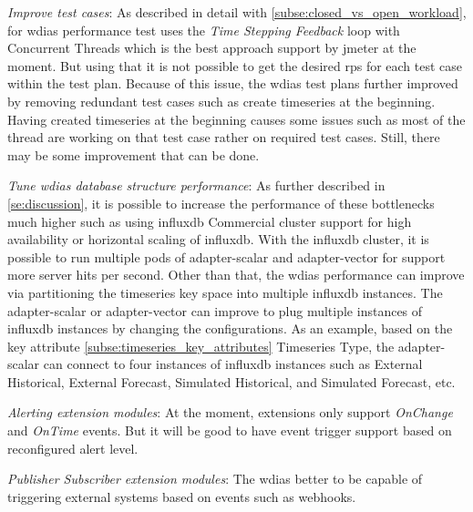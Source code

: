 \emph{Improve test cases}:
As described in detail with \cref{subse:closed_vs_open_workload}, for \acrshort{wdias} performance test uses the \emph{Time Stepping Feedback} loop with Concurrent Threads which is the best approach support by \acrshort{jmeter} at the moment. But using that it is not possible to get the desired \acrshort{rps} for each test case within the test plan.
Because of this issue, the \acrshort{wdias} test plans further improved by removing redundant test cases such as create timeseries at the beginning. Having created timeseries at the beginning causes some issues such as most of the thread are working on that test case rather on required test cases. Still, there may be some improvement that can be done. 

\emph{Tune \acrshort{wdias} database structure performance}:
As further described in \cref{se:discussion}, it is possible to increase the performance of these bottlenecks much higher such as using \acrshort{influxdb} Commercial cluster support for high availability or horizontal scaling of \acrshort{influxdb}. With the \acrshort{influxdb} cluster, it is possible to run multiple pods of adapter-scalar and adapter-vector for support more server hits per second.
Other than that, the \acrshort{wdias} performance can improve via partitioning the timeseries key space into multiple \acrshort{influxdb} instances. The adapter-scalar or adapter-vector can improve to plug multiple instances of \acrshort{influxdb} instances by changing the configurations. As an example, based on the key attribute \cref{subse:timeseries_key_attributes} Timeseries Type, the adapter-scalar can connect to four instances of \acrshort{influxdb} instances such as  External Historical, External Forecast, Simulated Historical, and Simulated Forecast, etc.

\emph{Alerting extension modules}:
At the moment, extensions only support \emph{OnChange} and \emph{OnTime} events. But it will be good to have event trigger support based on reconfigured alert level.

\emph{Publisher Subscriber extension modules}:
The \acrshort{wdias} better to be capable of triggering external systems based on events such as webhooks.

